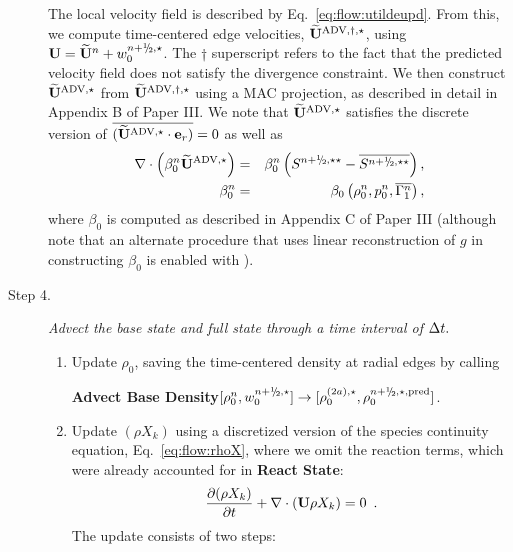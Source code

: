 \begin{description}
The local velocity field is described by Eq.~\ref{eq:flow:utildeupd}.
From this, we compute time-centered edge 
velocities, $\widetilde{{\bf U}}^{\mathrm{ADV},\dagger,\star}$, using 
$\Ub = \Ubt^n + w_0^{\nph,\star}$.  The $\dagger$ superscript refers to the 
fact that the predicted velocity field does not satisfy the divergence 
constraint.  We then construct $\widetilde{\mathbf{U}}^{\mathrm{ADV},\star}$ from $\widetilde{{\bf U}}^{\mathrm{ADV},\dagger,\star}$
using a MAC projection, as described in detail in Appendix B of Paper III.  
We note that $\widetilde{\mathbf{U}}^{\mathrm{ADV},\star}$ satisfies the discrete version of
$\overline{(\widetilde{\mathbf{U}}^{\mathrm{ADV},\star}\cdot{\bf e}_r)}=0$ as well as
\begin{eqnarray}
\nabla \cdot \left(\beta_0^n \uadvone\right) &=& \beta_0^n \left(S^{\nph,\star\star} - \overline{S^{\nph,\star\star}}\right),\\
 \beta_0^n &=& \beta_0 \left(\rho_0^n, p_0^n, \overline{\Gamma_1^n}\right),
\end{eqnarray}
where $\beta_0$ is computed as described in Appendix C of Paper III (although
note that an alternate procedure that uses linear reconstruction of $g$ in
constructing $\beta_0$ is enabled with ).


\item[Step 4.] {\em Advect the base state and full state through a time interval of $\Delta t.$}

\begin{enumerate}
\renewcommand{\theenumi}{{\bf \Alph{enumi}}}

\item Update $\rho_0$, saving the time-centered density at radial edges by calling

{\bf Advect Base Density}$[\rho_0^{n},w_0^{\nph,\star}] \rightarrow [\rho_0^{(2a),\star}, \rho_0^{\nph,\star,\pred}]$.

\item Update $(\rho X_k)$ using a discretized version of the species 
continuity equation, Eq.~\ref{eq:flow:rhoX}, where we omit the
reaction terms, which were already accounted for in {\bf React State}:
\begin{equation}
\frac{\partial (\rho X_k)}{\partial t} + \nabla \cdot ({\bf U} \rho X_k) = 0 \enskip .
\label{eq:species}
\end{equation}
The update consists of two steps:

\begin{enumerate}
\renewcommand{\labelenumii}{{\bf \roman{enumii}}.}


\end{enumerate}
\end{enumerate}
\end{description}
